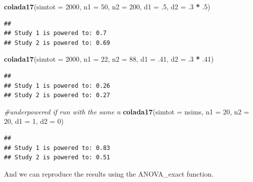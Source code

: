 \documentclass[]{book}
\newenvironment{Shaded}{\begin{snugshade}}{\end{snugshade}}
\newcommand{\CommentTok}[1]{\textcolor[rgb]{0.56,0.35,0.01}{\textit{#1}}}
\newcommand{\DataTypeTok}[1]{\textcolor[rgb]{0.13,0.29,0.53}{#1}}
\newcommand{\DecValTok}[1]{\textcolor[rgb]{0.00,0.00,0.81}{#1}}
\newcommand{\FloatTok}[1]{\textcolor[rgb]{0.00,0.00,0.81}{#1}}
\newcommand{\KeywordTok}[1]{\textcolor[rgb]{0.13,0.29,0.53}{\textbf{#1}}}
\newcommand{\NormalTok}[1]{#1}
\newcommand{\OperatorTok}[1]{\textcolor[rgb]{0.81,0.36,0.00}{\textbf{#1}}}
\newcommand{\StringTok}[1]{\textcolor[rgb]{0.31,0.60,0.02}{#1}}
\begin{document}
\begin{Shaded}
\begin{Highlighting}[]
  \KeywordTok{colada17}\NormalTok{(}\DataTypeTok{simtot =} \DecValTok{2000}\NormalTok{, }\DataTypeTok{n1 =} \DecValTok{50}\NormalTok{, }\DataTypeTok{n2 =} \DecValTok{200}\NormalTok{, }\DataTypeTok{d1 =} \FloatTok{.5}\NormalTok{, }\DataTypeTok{d2 =} \FloatTok{.3} \OperatorTok{*}\StringTok{ }\FloatTok{.5}\NormalTok{)}
\end{Highlighting}
\end{Shaded}

\begin{verbatim}
## 
## Study 1 is powered to: 0.7
## Study 2 is powered to: 0.69
\end{verbatim}

\begin{Shaded}
\begin{Highlighting}[]
  \KeywordTok{colada17}\NormalTok{(}\DataTypeTok{simtot =} \DecValTok{2000}\NormalTok{, }\DataTypeTok{n1 =} \DecValTok{22}\NormalTok{, }\DataTypeTok{n2 =} \DecValTok{88}\NormalTok{, }\DataTypeTok{d1 =} \FloatTok{.41}\NormalTok{, }\DataTypeTok{d2 =} \FloatTok{.3} \OperatorTok{*}\StringTok{ }\FloatTok{.41}\NormalTok{)}
\end{Highlighting}
\end{Shaded}

\begin{verbatim}
## 
## Study 1 is powered to: 0.26
## Study 2 is powered to: 0.27
\end{verbatim}

\begin{Shaded}
\begin{Highlighting}[]
\CommentTok{#underpowered if run with the same n}
\KeywordTok{colada17}\NormalTok{(}\DataTypeTok{simtot =}\NormalTok{ nsims, }\DataTypeTok{n1 =} \DecValTok{20}\NormalTok{, }\DataTypeTok{n2 =} \DecValTok{20}\NormalTok{, }\DataTypeTok{d1 =} \DecValTok{1}\NormalTok{, }\DataTypeTok{d2 =} \DecValTok{0}\NormalTok{)  }
\end{Highlighting}
\end{Shaded}

\begin{verbatim}
## 
## Study 1 is powered to: 0.83
## Study 2 is powered to: 0.51
\end{verbatim}

And we can reproduce the results using the ANOVA\_exact function.
\end{document}
